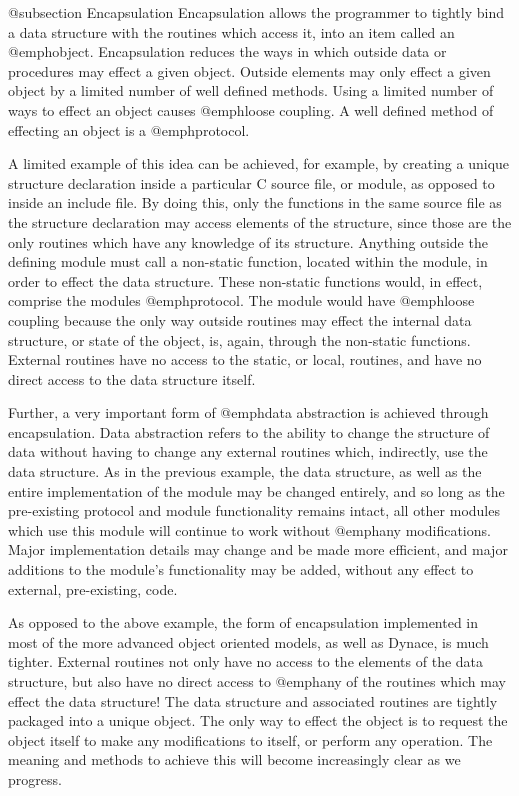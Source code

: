 @subsection Encapsulation
Encapsulation allows the programmer to tightly bind a data structure
with the routines which access it, into an item called an @emph{object}.
Encapsulation reduces the ways in which outside data or procedures may
effect a given object.  Outside elements may only effect a given object
by a limited number of well defined methods.  Using a limited number of
ways to effect an object causes @emph{loose coupling}.  A well defined
method of effecting an object is a @emph{protocol}.

A limited example of this idea can be achieved, for example, by creating
a unique structure declaration inside a particular C source file, or
module, as opposed to inside an include file.  By doing this, only the
functions in the same source file as the structure declaration may
access elements of the structure, since those are the only routines
which have any knowledge of its structure.  Anything outside the
defining module must call a non-static function, located within the
module, in order to effect the data structure.  These non-static
functions would, in effect, comprise the modules @emph{protocol}.  The
module would have @emph{loose coupling} because the only way outside
routines may effect the internal data structure, or state of the object,
is, again, through the non-static functions.  External routines have no
access to the static, or local, routines, and have no direct access to
the data structure itself.

Further, a very important form of @emph{data abstraction} is achieved
through encapsulation. Data abstraction refers to the ability to change
the structure of data without having to change any external routines
which, indirectly, use the data structure.  As in the previous example,
the data structure, as well as the entire implementation of the module
may be changed entirely, and so long as the pre-existing protocol and
module functionality remains intact, all other modules which use this
module will continue to work without @emph{any} modifications.  Major
implementation details may change and be made more efficient, and
major additions to the module's functionality may be added, without
any effect to external, pre-existing, code.

As opposed to the above example, the form of encapsulation implemented
in most of the more advanced object oriented models, as well as Dynace, is
much tighter.  External routines not only have no access to the elements
of the data structure, but also have no direct access to @emph{any} of
the routines which may effect the data structure!  The data structure
and associated routines are tightly packaged into a unique object.  The
only way to effect the object is to request the object itself to make
any modifications to itself, or perform any operation.  The meaning and
methods to achieve this will become increasingly clear as we progress.


